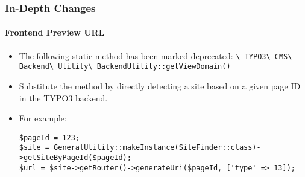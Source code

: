 
\begin{frame}[fragile]
	\frametitle{In-Depth Changes}
	\framesubtitle{Frontend Preview URL}

	\lstset{basicstyle=\tiny\ttfamily}

	\begin{itemize}
		\item The following static method has been marked deprecated:\newline
			\smaller\texttt{\textbackslash
				TYPO3\textbackslash
				CMS\textbackslash
				Backend\textbackslash
				Utility\textbackslash
				BackendUtility::getViewDomain()}\normalsize

		\item Substitute the method by directly detecting a site based on a given page ID in the TYPO3 backend.
		\item For example:
\begin{lstlisting}
$pageId = 123;
$site = GeneralUtility::makeInstance(SiteFinder::class)->getSiteByPageId($pageId);
$url = $site->getRouter()->generateUri($pageId, ['type' => 13]);
\end{lstlisting}

	\end{itemize}

\end{frame}


